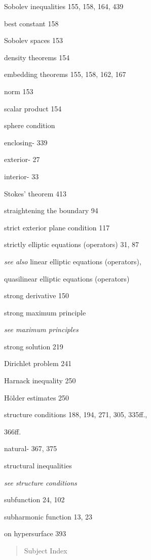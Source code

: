 Sobolev inequalities 155, 158, 164, 439

\quad best constant 158

Sobolev spaces 153

\quad density theorems 154

\quad embedding theorems 155, 158, 162, 167

\quad norm 153

\quad scalar product 154

sphere condition

\quad enclosing- 339

\quad exterior- 27

\quad interior- 33

Stokes' theorem 413

straightening the boundary 94

strict exterior plane condition 117

strictly elliptic equations (operators) 31, 87

\quad \emph{see also} linear elliptic equations (operators),

\qquad quasilinear elliptic equations (operators)

strong derivative 150

strong maximum principle

\quad \emph{see maximum principles}

strong solution 219

\quad Dirichlet problem 241

\quad Harnack inequality 250

\quad H\"older estimates 250

structure conditions 188, 194, 271, 305, 335ff.,

\quad 366ff.

\quad natural- 367, 375

structural inequalities

\quad \emph{see structure conditions}

subfunction 24, 102

subharmonic function 13, 23

\quad on hypersurface 393



\begin{quote}
Subject Index
\end{quote}

